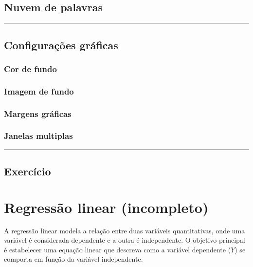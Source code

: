 \documentclass[
]{book}
\begin{document}
\section{Nuvem de palavras}\label{nuvem-de-palavras}

\begin{center}\rule{0.5\linewidth}{0.5pt}\end{center}

\section{Configurações gráficas}\label{configurauxe7uxf5es-gruxe1ficas}

\subsection{Cor de fundo}\label{cor-de-fundo}

\subsection{Imagem de fundo}\label{imagem-de-fundo}

\subsection{Margens gráficas}\label{margens-gruxe1ficas}

\subsection{Janelas multiplas}\label{janelas-multiplas}

\begin{center}\rule{0.5\linewidth}{0.5pt}\end{center}

\section{Exercício}\label{exercuxedcio}

\chapter{Regressão linear (incompleto)}\label{regressuxe3o-linear-incompleto}

A regressão linear modela a relação entre duas variáveis quantitativas, onde uma variável é considerada dependente e a outra é independente. O objetivo principal é estabelecer uma equação linear que descreva como a variável dependente (\(Y\)) se comporta em função da variável independente.
\end{document}
